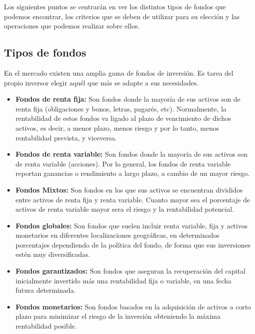 \documentclass[12pt, a4paper]{book}
\begin{document}
Los siguientes puntos se centrarán en ver los distintos tipos de fondos que podemos encontrar, los criterios que se deben de utilizar para su elección y las operaciones que podemos realizar sobre ellos.

\subsection{Tipos de fondos }

En el mercado existen una amplia gama de fondos de inversión. Es tarea del propio inversor elegir aquél que más se adapte a sus necesidades.

\begin{itemize}
	\item \textbf{Fondos de renta fija:} Son fondos donde la mayoría de sus activos son de renta fija (obligaciones y bonos, letras, pagarés, etc). Normalmente, la rentabilidad de estos fondos va ligado al plazo de vencimiento de dichos activos, es decir, a menor plazo, menos riesgo y por lo tanto, menos rentabilidad prevista, y viceversa.
	\item \textbf{Fondos de renta variable:} Son fondos donde la mayoría de sus activos son de renta variable (acciones). Por lo general, los fondos de renta variable reportan ganancias o rendimiento a largo plazo, a cambio de un mayor riesgo.
	
		\newpage
	
	\item \textbf{Fondos Mixtos:} Son fondos en los que sus activos se encuentran divididos entre activos de renta fija y renta variable. Cuanto mayor sea el porcentaje de activos de renta variable mayor sera el riesgo y la rentabilidad potencial.
	\item \textbf{Fondos globales:} Son fondos que suelen incluir renta variable, fija y activos monetarios en diferentes localizaciones geográficas, en determinados porcentajes dependiendo de la política del fondo, de forma que sus inversiones estén muy diversificadas.
	\item \textbf{Fondos garantizados:} Son fondos que aseguran la recuperación del capital inicialmente invertido más una rentabilidad fija o variable, en una fecha futura determinada.
	\item \textbf{Fondos monetarios:} Son fondos basados en la adquisición de activos a corto plazo para minimizar el riesgo de la inversión obteniendo la máxima rentabilidad posible.
\end{itemize}
\end{document}
